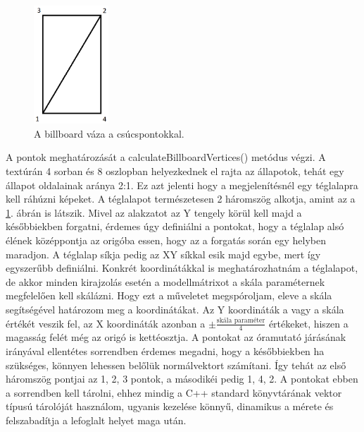 \begin{figure}
 \centering
 \includegraphics[width=0.25\textwidth]{kepek/billboardFrame.png}
 \caption{A billboard váza a csúcspontokkal.}
 \label{fig:billboardFrame}
\end{figure}
A pontok meghatározását a calculateBillboardVertices() metódus végzi. A textúrán 4 sorban és 8 oszlopban helyezkednek el rajta az állapotok, tehát egy állapot oldalainak aránya 2:1. Ez azt jelenti hogy a megjelenítésnél egy téglalapra kell ráhúzni képeket. A téglalapot természetesen 2 háromszög alkotja, amint az a \ref{fig:billboardFrame}. ábrán is látszik. 
Mivel az alakzatot az Y tengely körül kell majd a későbbiekben forgatni, érdemes úgy definiálni a pontokat, hogy a téglalap alsó élének középpontja az origóba essen, hogy az a forgatás során egy helyben maradjon. A téglalap síkja pedig az XY síkkal esik majd egybe, mert így egyszerűbb definiálni. Konkrét koordinátákkal is meghatározhatnám a téglalapot, de akkor minden kirajzolás esetén a modellmátrixot a skála paraméternek megfelelően kell skálázni. Hogy ezt a műveletet megspóroljam, eleve a skála segítségével határozom meg a koordinátákat. Az Y koordináták a vagy a skála értékét veszik fel, az X koordináták azonban a $\pm \frac{\text{skála paraméter}}{4}$ értékeket, hiszen a magasság felét még az origó is kettéosztja. A pontokat az óramutató járásának irányával ellentétes sorrendben érdemes megadni, hogy a későbbiekben ha szükséges, könnyen lehessen belőlük normálvektort számítani. Így tehát az első háromszög pontjai az 1, 2, 3 pontok, a másodikéi pedig 1, 4, 2. A pontokat ebben a sorrendben kell tárolni, ehhez mindig a C++ standard könyvtárának vektor típusú tárolóját használom, ugyanis kezelése könnyű, dinamikus a mérete és felszabadítja a lefoglalt helyet maga után.

